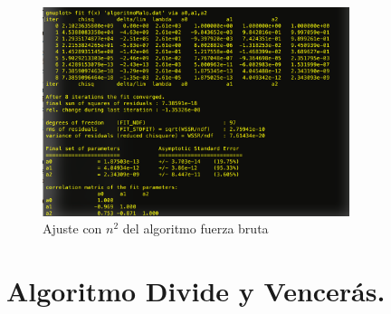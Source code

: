 \documentclass[a4paper, 11pt]{article}
\begin{document}
\begin{figure}[!htp]
	\includegraphics[width=0.8\textwidth]{maloajuste}
	\caption{Ajuste con $n^2$ del algoritmo fuerza bruta\label{AJustemal}}
\end{figure}
\pagebreak
\section{Algoritmo Divide y Vencerás.}
\end{document}
